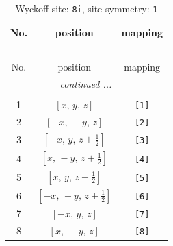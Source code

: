 \documentclass[fleqn,8pt]{jsarticle}
\begin{document}
\renewcommand{\arraystretch}{1.2}
\begin{longtable}{ccc}
\caption{Wyckoff site: {\tt 8i}, site symmetry: {\tt 1}}
 \\
 \hline \hline
No. & position & mapping \\ \hline \endfirsthead

\multicolumn{2}{l}{\tablename\ \thetable{}} \\
 \hline \hline
No. & position & mapping \\ \hline \endhead

 \hline \hline
\multicolumn{2}{r}{\footnotesize\it continued ...} \\ \endfoot

 \hline \hline
\multicolumn{2}{r}{} \\ \endlastfoot

1 & $\left[ x,\, y,\, z \right]$ & {\tt [1]} \\ \hline
2 & $\left[ - x,\, - y,\, z \right]$ & {\tt [2]} \\ \hline
3 & $\left[ - x,\, y,\, z + \frac{1}{2} \right]$ & {\tt [3]} \\ \hline
4 & $\left[ x,\, - y,\, z + \frac{1}{2} \right]$ & {\tt [4]} \\ \hline
5 & $\left[ x,\, y,\, z + \frac{1}{2} \right]$ & {\tt [5]} \\ \hline
6 & $\left[ - x,\, - y,\, z + \frac{1}{2} \right]$ & {\tt [6]} \\ \hline
7 & $\left[ - x,\, y,\, z \right]$ & {\tt [7]} \\ \hline
8 & $\left[ x,\, - y,\, z \right]$ & {\tt [8]} \\
\end{longtable}
\end{document}
